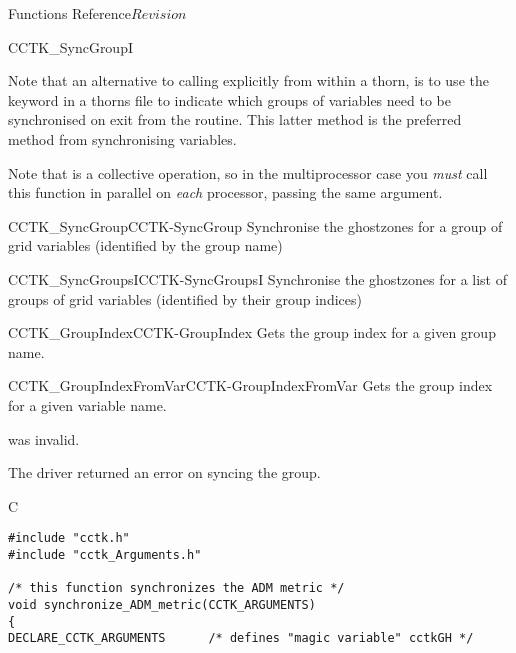 \begin{cactuspart}{ Functions Reference}{}{$Revision$}
\begin{FunctionDescription}{CCTK\_SyncGroupI}
\begin{Discussion}
Note that an alternative to calling  explicitly
from within a thorn, is to use the  keyword in a thorns
 file to indicate which groups of variables need
to be synchronised on exit from the routine. This latter method is
the preferred method from synchronising variables.

Note that  is a collective operation, so in the
multiprocessor case you {\em must\/} call this function in parallel on
{\em each\/} processor, passing the same  argument.
\end{Discussion}

\begin{SeeAlsoSection}
\begin{SeeAlso2}{CCTK\_SyncGroup}{CCTK-SyncGroup}
Synchronise the ghostzones for a group of grid variables
(identified by the group name)
\end{SeeAlso2}
\begin{SeeAlso2}{CCTK\_SyncGroupsI}{CCTK-SyncGroupsI}
Synchronise the ghostzones for a list of groups of grid variables
(identified by their group indices)
\end{SeeAlso2}
\begin{SeeAlso2}{CCTK\_GroupIndex}{CCTK-GroupIndex}
Gets the group index for a given group name.
\end{SeeAlso2}
\begin{SeeAlso2}{CCTK\_GroupIndexFromVar}{CCTK-GroupIndexFromVar}
Gets the group index for a given variable name.
\end{SeeAlso2}
\end{SeeAlsoSection}

\begin{ErrorSection}
\begin{Error}{-1}
 was invalid.
\end{Error}
\begin{Error}{-2}
The driver returned an error on syncing the group.
\end{Error}
\end{ErrorSection}

\begin{ExampleSection}
\begin{Example}{C}
\begin{verbatim}
#include "cctk.h"
#include "cctk_Arguments.h"

/* this function synchronizes the ADM metric */
void synchronize_ADM_metric(CCTK_ARGUMENTS)
{
DECLARE_CCTK_ARGUMENTS      /* defines "magic variable" cctkGH */


\end{verbatim}
\end{Example}
\end{ExampleSection}
\end{FunctionDescription}
\end{cactuspart}
